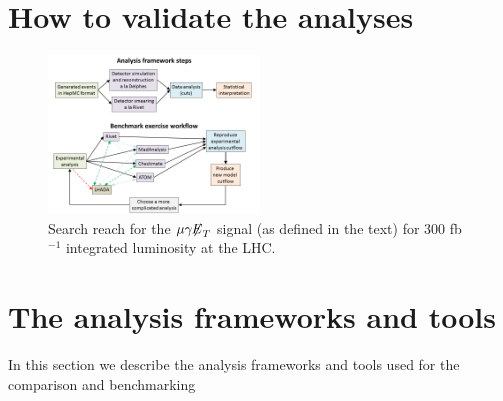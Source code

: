 \documentclass[11pt]{cernrep}
\begin{document}
\section{How to validate the analyses}
\begin{figure}
\begin{center}
\includegraphics[width=0.5\textwidth]{figures/lhada_benchmarking_excersise.png}
 \caption{Search reach for the $\mu \gamma {\not\!\!E}_{T}$ signal
(as defined in the
   text) for
   300 fb$^{-1}$ integrated luminosity  at the LHC.
}
\label{search}
\end{center}
\end{figure}


\section{The analysis frameworks and tools}
In this section we describe the analysis frameworks and tools used for the comparison and benchmarking
\end{document}
